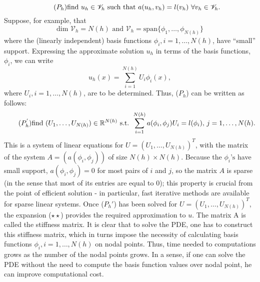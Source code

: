 \begin{equation*}\tag{$P_{h}$}
	\text{find } u_h \in \mathscr{V}_h\text{ such that } a(u_h, v_h) = l(v_h) \text{ } \forall v_h \in \mathscr{V}_h .  
\end{equation*}
Suppose, for example, that
\begin{equation*}
\text{dim }\mathscr{V}_h = N(h) \text{ and } \mathscr{V}_h = \text{span} \{ \phi_1, \dots, \phi_{N(h)} \}
\end{equation*}
where the (linearly independent) basis functions $\phi_i, i=1,\dots,N(h)$, have ``small'' support. Expressing the approximate solution $u_h$ in terms of the basis functions, $\phi_i$, we can write
\begin{equation*}
\tag{$\star\star$}
u_h (x) = \sum_{i=1}^{N(h)} U_i \phi_{i}(x),
\end{equation*}
where $U_i, i = 1, \dots, N(h)$, are to be determined. Thus, ($P_h$) can be written as follows:
\begin{equation*}
\tag{$P_h^{'}$}
\text{find } (U_1, \dots, U_{N(h)}) \in \mathbb{R}^{N(h)} \text{ s.t. } \sum_{i=1}^{N(h)} a(\phi_i, \phi_j) U_i = l(\phi_i)\text{,     }j=1,\dots, N(h).
\end{equation*}
This is a system of linear equations for $U = (U_1 , \dots, U_{N(h)})^T$, with the matrix of the system $A = (a(\phi_i, \phi_j))$ of size $N(h)\times N(h)$. Because the $\phi_i\text{'s}$ have small support, $a(\phi_i, \phi_j) = 0$ for most pairs of $i$ and $j$, so the matrix $A$ is sparse (in the sense that most of its entries are equal to 0); this property is crucial from the point
of efficient solution - in particular, fast iterative methods are available for sparse linear systems. Once ($P_h{'}$) has been solved for $U = (U_1 , \dots, U_{N(h)})^T$, the expansion ($\star\star$) provides the required approximation to $u$. The matrix A is called the stiffness matrix. It is clear that to solve the PDE, one has to construct this stiffness matrix, which in turns impose the necessity of calculating basis functions $\phi_i, i=1,\dots,N(h)$ on nodal points. Thus, time needed to computations grows as the number of the nodal points grows. In a sense, if one can solve the PDE without the need to compute the basis function values over nodal point, he can improve computational cost.
